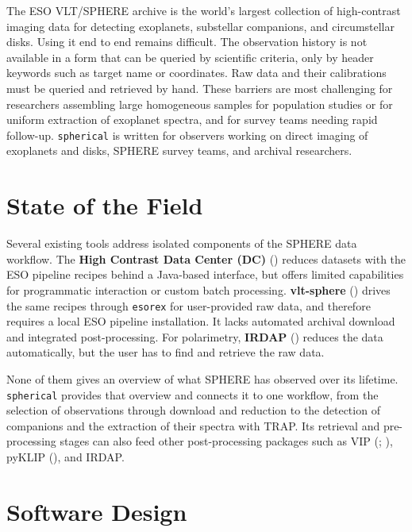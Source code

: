 \documentclass[
]{article}
\begin{document}
The ESO VLT/SPHERE archive is the world's largest collection of
high-contrast imaging data for detecting exoplanets, substellar
companions, and circumstellar disks. Using it end to end remains
difficult. The observation history is not available in a form that can
be queried by scientific criteria, only by header keywords such as
target name or coordinates. Raw data and their calibrations must be
queried and retrieved by hand. These barriers are most challenging for
researchers assembling large homogeneous samples for population studies
or for uniform extraction of exoplanet spectra, and for survey teams
needing rapid follow-up. \texttt{spherical} is written for observers
working on direct imaging of exoplanets and disks, SPHERE survey teams,
and archival researchers.

\section{State of the Field}\label{state-of-the-field}

Several existing tools address isolated components of the SPHERE data
workflow. The \textbf{High Contrast Data Center (DC)}
() reduces datasets
with the ESO pipeline recipes behind a Java-based interface, but offers
limited capabilities for programmatic interaction or custom batch
processing. \textbf{vlt-sphere} ()
drives the same recipes through \texttt{esorex} for user-provided raw
data, and therefore requires a local ESO pipeline installation. It lacks
automated archival download and integrated post-processing. For
polarimetry, \textbf{IRDAP} () reduces the data automatically, but the user
has to find and retrieve the raw data.

None of them gives an overview of what SPHERE has observed over its
lifetime. \texttt{spherical} provides that overview and connects it to
one workflow, from the selection of observations through download and
reduction to the detection of companions and the extraction of their
spectra with TRAP. Its retrieval and pre-processing stages can also feed
other post-processing packages such as VIP
(;
), pyKLIP
(), and IRDAP.

\section{Software Design}\label{software-design}
\end{document}
